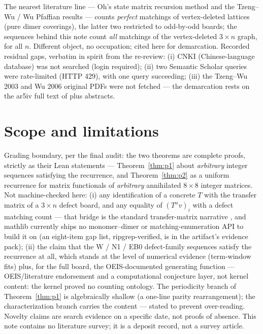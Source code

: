 \documentclass[11pt]{article}
\begin{document}
The nearest literature line --- Oh's state matrix recursion method
\cite{oh-2019} and the Tzeng--Wu / Wu Pfaffian results
\cite{tzeng-wu-2003,wu-2006} --- counts \emph{perfect} matchings of
vertex-deleted lattices (pure dimer coverings), the latter two restricted to
odd-by-odd boards; the sequences behind this note count \emph{all} matchings
of the vertex-deleted $3\times n$ graph, for all $n$. Different object, no
occupation; cited here for demarcation. Recorded residual gaps, verbatim in
spirit from the re-review: (i) CNKI (Chinese-language database) was not
searched (login required); (ii) two Semantic Scholar queries were
rate-limited (HTTP 429), with one query succeeding; (iii) the Tzeng--Wu 2003
and Wu 2006 original PDFs were not fetched --- the demarcation rests on the
ar5iv full text of \cite{oh-2019} plus abstracts.

\section{Scope and limitations}\label{sec:scope}

Grading boundary, per the final audit: the two theorems are complete proofs,
strictly as their Lean statements --- Theorem~\ref{thm:p1} about
\emph{arbitrary} integer sequences satisfying the recurrence, and
Theorem~\ref{thm:p2} as a uniform recurrence for matrix functionals of
\emph{arbitrary} annihilated $8\times 8$ integer matrices. Not
machine-checked here: (i) any identification of a concrete $T$ with the
transfer matrix of a $3\times n$ defect board, and any equality of
$(T^n v)_i$ with a defect matching count --- that bridge is the standard
transfer-matrix narrative \cite{oeis-a033506,lundow-1998,propp-1999}, and
mathlib currently ships no monomer--dimer or matching-enumeration API to
build it on (an eight-item gap list, ripgrep-verified, is in the artifact's
evidence pack); (ii) the claim that the W / N1 / EB0 defect-family sequences
satisfy the recurrence at all, which stands at the level of numerical
evidence (term-window fits) plus, for the full board, the OEIS-documented
generating function --- OEIS/literature endorsement and a computational
conjecture layer, not kernel content: the kernel proved no counting ontology.
The periodicity branch of Theorem~\ref{thm:p1} is algebraically shallow (a
one-line parity rearrangement); the characterization branch carries the
content --- stated to prevent over-reading. Novelty claims are search
evidence on a specific date, not proofs of absence. This note contains no
literature survey; it is a deposit record, not a survey article.
\end{document}
